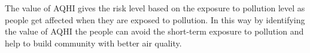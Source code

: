 
The value of AQHI gives the risk level based on the exposure to pollution level as people get affected when they are exposed to pollution. In this way by identifying the value of AQHI the people can avoid the short-term exposure to pollution and help to build community with better air quality.  






\par

 
